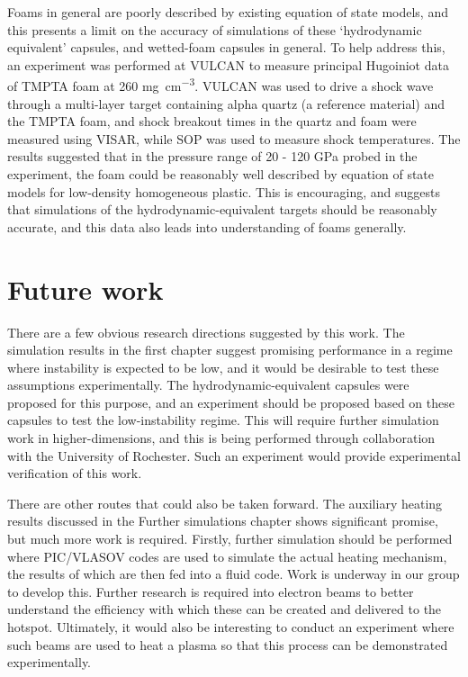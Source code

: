 Foams in general are poorly described by existing equation of state models, and this presents a limit on the accuracy of simulations of these `hydrodynamic equivalent' capsules, and wetted-foam capsules in general. To help address this, an experiment was performed at VULCAN to measure principal Hugoiniot data of TMPTA foam at 260 \unit{\milli\gram\per\centi\meter\cubed}. VULCAN was used to drive a shock wave through a multi-layer target containing alpha quartz (a reference material) and the TMPTA foam, and shock breakout times in the quartz and foam were measured using VISAR, while SOP was used to measure shock temperatures. The results suggested that in the pressure range of 20 - 120 \unit{\giga\pascal} probed in the experiment, the foam could be reasonably well described by equation of state models for low-density homogeneous plastic. This is encouraging, and suggests that simulations of the hydrodynamic-equivalent targets should be reasonably accurate, and this data also leads into understanding of foams generally.

\section{Future work}
There are a few obvious research directions suggested by this work. The simulation results in the first chapter suggest promising performance in a regime where instability is expected to be low, and it would be desirable to test these assumptions experimentally. The hydrodynamic-equivalent capsules were proposed for this purpose, and an experiment should be proposed based on these capsules to test the low-instability regime. This will require further simulation work in higher-dimensions, and this is being performed through collaboration with the University of Rochester. Such an experiment would provide experimental verification of this work.

There are other routes that could also be taken forward. The auxiliary heating results discussed in the Further simulations chapter shows significant promise, but much more work is required. Firstly, further simulation should be performed where PIC/VLASOV codes are used to simulate the actual heating mechanism, the results of which are then fed into a fluid code. Work is underway in our group to develop this. Further research is required into electron beams to better understand the efficiency with which these can be created and delivered to the hotspot. Ultimately, it would also be interesting to conduct an experiment where such beams are used to heat a plasma so that this process can be demonstrated experimentally.

